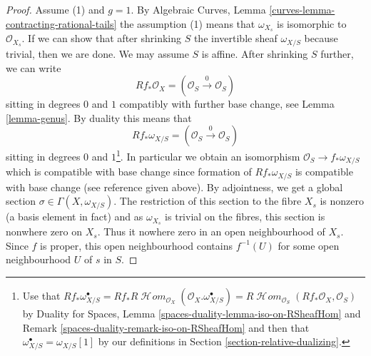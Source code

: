 \documentclass[10pt,a4paper]{amsart}
\theoremstyle{plain}
\theoremstyle{definition}
\theoremstyle{remark}
\numberwithin{equation}{subsection}
\def\SheafHom{\mathop{\mathcal{H}\!\mathit{om}}\nolimits}
\begin{document}
\begin{proof}
\medskip\noindent
Assume (1) and $g = 1$. By
Algebraic Curves, Lemma \ref{curves-lemma-contracting-rational-tails}
the assumption (1) means that $\omega_{X_s}$ is isomorphic to
$\mathcal{O}_{X_s}$. If we can show that after shrinking $S$
the invertible sheaf $\omega_{X/S}$ because trivial, then
we are done. We may assume $S$ is affine. After shrinking $S$
further, we can write
$$
Rf_*\mathcal{O}_X = (\mathcal{O}_S \xrightarrow{0} \mathcal{O}_S)
$$
sitting in degrees $0$ and $1$
compatibly with further base change, see Lemma \ref{lemma-genus}.
By duality this means that
$$
Rf_*\omega_{X/S} = (\mathcal{O}_S \xrightarrow{0} \mathcal{O}_S)
$$
sitting in degrees $0$ and $1$\footnote{Use that
$Rf_*\omega_{X/S}^\bullet =
Rf_*R\SheafHom_{\mathcal{O}_X}(\mathcal{O}_X. \omega_{X/S}^\bullet) =
R\SheafHom_{\mathcal{O}_S}(Rf_*\mathcal{O}_X, \mathcal{O}_S)$
by Duality for Spaces, Lemma \ref{spaces-duality-lemma-iso-on-RSheafHom} and
Remark \ref{spaces-duality-remark-iso-on-RSheafHom}
and then that $\omega_{X/S}^\bullet = \omega_{X/S}[1]$ by
our definitions in Section \ref{section-relative-dualizing}.}.
In particular we obtain an isomorphism $\mathcal{O}_S \to f_*\omega_{X/S}$
which is compatible with base change since
formation of $Rf_*\omega_{X/S}$ is compatible with base change
(see reference given above).
By adjointness, we get a global section $\sigma \in \Gamma(X, \omega_{X/S})$.
The restriction of this section to the fibre $X_s$
is nonzero (a basis element in fact) and as
$\omega_{X_s}$ is trivial on the fibres,
this section is nonwhere zero on $X_s$.
Thus it nowhere zero in
an open neighbourhood of $X_s$. Since $f$ is proper, this open
neighbourhood contains $f^{-1}(U)$ for some open neighbourhood
$U$ of $s$ in $S$.
\end{proof}
\end{document}
